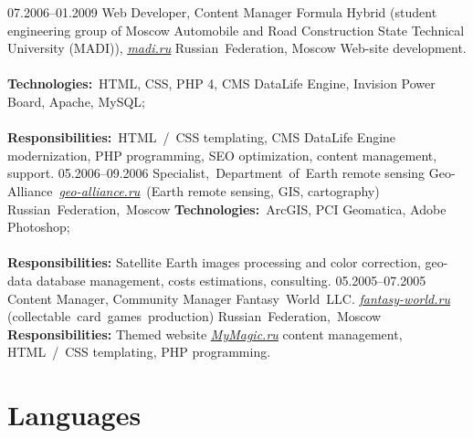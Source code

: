 \documentclass[12pt,a4paper,final]{moderncv}
\begin{document}
%
\cventry
{07.2006--01.2009}
{Web Developer, Content Manager}
{
  Formula Hybrid (student engineering group of Moscow Automobile and Road Construction State Technical University (MADI)), \underline{\href{http://madi.ru}{\itshape madi.ru}}
}
{Russian~Federation, Moscow}
{}
{
  Web-site development.
  \\\\
  \textbf{Technologies:}~HTML, CSS, PHP 4, CMS DataLife Engine, Invision Power Board, Apache, MySQL;
  \\\\
  \textbf{Responsibilities:}~HTML~/~CSS templating, CMS DataLife Engine modernization, PHP programming, SEO optimization, content management, support.
}
%
\cventry
{05.2006--09.2006}
{Specialist,~Department~of~Earth remote sensing}
{Geo-Alliance~\underline{\href{http://geo-alliance.ru}{\itshape geo-alliance.ru}}~(Earth remote sensing, GIS, cartography)}
{Russian~Federation,~Moscow}
{}
{
\textbf{Technologies:}~ArcGIS, PCI Geomatica, Adobe Photoshop;
\\\\
\textbf{Responsibilities:} Satellite Earth images processing and color correction, geo-data database management, costs estimations, consulting.
}
%
\cventry
{05.2005--07.2005}
{Content Manager, Community Manager}
{Fantasy~World~LLC. \underline{\href{http://fantasy-world.ru}{\itshape fantasy-world.ru}} (collectable~card~games~production)}
{Russian~Federation,~Moscow}
{}
{
  \textbf{Responsibilities:} Themed website \underline{\href{http://mymagic.ru}{\itshape MyMagic.ru}} content management, HTML~/~CSS templating, PHP programming.
}

\section{Languages}
\end{document}
